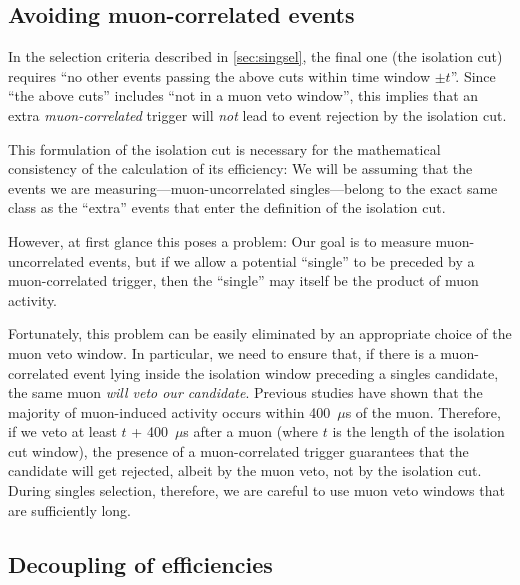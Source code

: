 \documentclass[../thesis.tex]{subfiles}
\begin{document}
\subsection{Avoiding muon-correlated events}
\label{sec:avoidmuoncorr}

In the selection criteria described in \autoref{sec:singsel}, the final one
(the isolation cut) requires ``no other events passing the above cuts within
time window $\pm t$''. Since ``the above cuts'' includes ``not in a muon veto
window'', this implies that an extra \emph{muon-correlated} trigger will
\emph{not} lead to event rejection by the isolation cut.

This formulation of the isolation cut is necessary for the mathematical
consistency of the calculation of its efficiency: We will be assuming that the
events we are measuring---muon-uncorrelated singles---belong to the exact same
class as the ``extra'' events that enter the definition of the isolation cut.

However, at first glance this poses a problem: Our goal is to measure
muon-uncorrelated events, but if we allow a potential ``single'' to be preceded
by a muon-correlated trigger, then the ``single'' may itself be the product of
muon activity.

Fortunately, this problem can be easily eliminated by an appropriate choice of
the muon veto window. In particular, we need to ensure that, if there is a
muon-correlated event lying inside the isolation window preceding a singles
candidate, the same muon \emph{will veto our candidate}. Previous studies have
shown that the majority of muon-induced activity occurs within 400~$\mu$s of the
muon. Therefore, if we veto at least $t$ + 400~$\mu$s after a muon (where $t$ is
the length of the isolation cut window), the presence of a muon-correlated
trigger guarantees that the candidate will get rejected, albeit by the muon
veto, not by the isolation cut. During singles selection, therefore, we are
careful to use muon veto windows that are sufficiently long.

\subsection{Decoupling of efficiencies}
\label{sec:effdecoup}

\def\Pa{\ensuremath{P_\mathrm{a}}} \def\Pb{\ensuremath{P_\mathrm{b}}}
\def\Pab{\ensuremath{P_\mathrm{ab}}}
\end{document}
